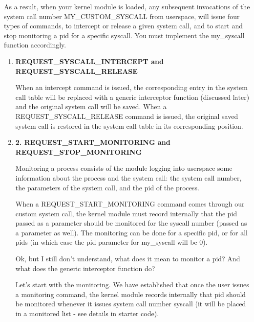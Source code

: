 \documentclass[12pt]{article}
\begin{document}
\begin{itemize}
    As a result, when your kernel module is loaded, any subsequent invocations of
    the system call number MY\_CUSTOM\_SYSCALL from userspace, will issue four
    types of commands, to intercept or release a given system call, and to start
    and stop monitoring a pid for a specific syscall. You must implement the my\_syscall
    function accordingly.

    \bigskip

    \begin{enumerate}[1.]
    \item \textbf{REQUEST\_SYSCALL\_INTERCEPT and REQUEST\_SYSCALL\_RELEASE}
    \bigskip

    When an intercept command is issued, the corresponding entry in the system
    call table will be replaced with a generic interceptor function (discussed later)
    and the original system call will be saved. When a REQUEST\_SYSCALL\_RELEASE
    command is issued, the original saved system call is restored in the system
    call table in its corresponding position.

    \item \textbf{2. REQUEST\_START\_MONITORING and REQUEST\_STOP\_MONITORING}

    \bigskip

    Monitoring a process consists of the module logging into userspace some information
    about the process and the system call: the system call number, the parameters of
    the system call, and the pid of the process.

    \bigskip

    When a REQUEST\_START\_MONITORING command comes through our custom system call,
    the kernel module must record internally that the pid passed as a parameter
    should be monitored for the syscall number (passed as a parameter as well).
    The monitoring can be done for a specific pid, or for all pids (in which case
    the pid parameter for my\_syscall will be 0).

    \bigskip

    Ok, but I still don't understand, what does it mean to monitor a pid? And
    what does the generic interceptor function do?

    \bigskip

    Let's start with the monitoring. We have established that once the user issues
    a monitoring command, the kernel module records internally that pid should be
    monitored whenever it issues system call number syscall (it will be placed in
    a monitored list - see details in starter code).


\end{enumerate}
\end{itemize}
\end{document}

